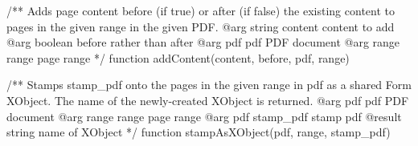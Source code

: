 /** Adds page content before (if true) or after (if false) the existing
content to pages in the given range in the given PDF.
@arg {string} content content to add
@arg {boolean} before rather than after
@arg {pdf} pdf PDF document
@arg {range} range page range */
function addContent(content, before, pdf, range) {}

/** Stamps stamp_pdf onto the pages in the given range in pdf as a shared Form
XObject. The name of the newly-created XObject is returned.
@arg {pdf} pdf PDF document
@arg {range} range page range
@arg {pdf} stamp_pdf stamp pdf
@result {string} name of XObject */
function stampAsXObject(pdf, range, stamp_pdf) {}

